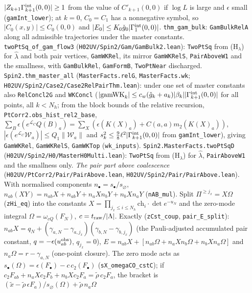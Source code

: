 \documentclass[11pt]{amsart}
\theoremstyle{definition}
\theoremstyle{remark}
\numberwithin{equation}{section}
\begin{document}
$|Z_{k+1}\Gamma^{\rm int}_{k+1}(0,0)|\ge1$ from the value of $C'_{k+1}(0,0)$ if $\log L$ is large and $\epsilon$ small (\texttt{gamInt\_lower});
at $k=0$, $C_0=C_1$ has a nonnegative symbol, so $|C_0(x,y)|\le C_0(0,0)$ and $|E_0|\le K_0\check g_0|\Gamma^{\rm int}_1(0,0)|$.
\texttt{thm\_gam\_bulk}: \texttt{GamBulkRelA} along all admissible trajectories under the master constants. \texttt{twoPtSq\_of\_gam\_flow3}
(\texttt{H02UV/Spin2/Gam/GamBulk2.lean}): \texttt{TwoPtSq} from (H$_\lambda$) for $\hat\lambda$ and both pair vertices, \texttt{GamWKRel}, its mirror \texttt{GamWKRelS},
\texttt{PairAboveW1} and the smallness, with \texttt{GamBulkRel}, \texttt{GamFormB}, \texttt{TwoPtNear} discharged.
\texttt{Spin2.thm\_master\_all} (\texttt{MasterFacts.relG}, \texttt{MasterFacts.wk}; \texttt{H02UV/Spin2/Case2/Case2RelPairThm.lean}): under one set of master constants also
\texttt{RelConcl2G} and \texttt{WKConcl} ($|\mathrm{gamWK}_k|\le c_w(\check g_k+a_k)|\beta_k||\Gamma^{\rm int}_{k+1}(0,0)|$ for all
points, all $k<N_h$; from the block bounds of the relative recursion, \texttt{PtCorr2.obs\_hist\_rel2\_base},
$\sum_B\epsilon(e^{\mathcal L_C}Q(B)_a)=\sum_X(\epsilon(K(X)_a)+C(a,a)m_2(K(X)_a))$, $|\epsilon(e^{\mathcal L_C}\mathcal W_a)|\le Q_1\|\mathcal W_a\|$ and
$s_k^2\le\frac98\ell^2|\Gamma^{\rm int}_{k+1}(0,0)|$ from \texttt{gamInt\_lower}), giving \texttt{GamWKRel}, \texttt{GamWKRelS}, \texttt{GamWKTop}
(\texttt{wk\_inputs}). \texttt{Spin2.MasterFacts.twoPtSqD} (\texttt{H02UV/Spin2/H0/MasterH0Multi.lean}): \texttt{TwoPtSq} from (H$_\lambda$) for
$\hat\lambda$, \texttt{PairAboveW1} and the smallness only.
\emph{The pair part above coalescence} (\texttt{H02UV/PtCorr2/Pair/PairAbove.lean}, \texttt{H02UV/Spin2/Pair/PairAbove.lean}). With normalised components
$n_\bullet=s_\bullet/s_\varnothing$, $n_{ab}(XY)=n_{ab}X+n_{ab}Y+n_aXn_bY+n_bXn_aY$ (\texttt{nAB\_mul}). Split $\Pi^{\ge j_x}=X\Omega$ (\texttt{zHi\_eq}) into the constants
$X=\prod_{j_x\le i\le N_h}\mathrm{ch}_i\cdot\det e^{-u_N}$ and the zero-mode integral $\Omega=\omega_{cQ}(F_N)$, $c=t_{\rm raw}/|\Lambda|$. Exactly
(\texttt{zCst\_coup}, \texttt{pair\_E\_split}): $n_{ab}X=q_N+(\gamma_{a,N}-\gamma_{a,j_x})(\gamma_{b,N}-\gamma_{b,j_x})$ (the Pauli-adjusted accumulated pair
constant, $q=-\epsilon(u^{\rm obs}_{ab})$, $q_{j_x}=0$), $E=n_{ab}X+[n_{ab}\Omega+n_aXn_b\Omega+n_bXn_a\Omega]$ and $n_a\Omega=r-\gamma_{a,N}$ (one-point
closure). The zero mode acts as $s_\bullet(\Omega)=\epsilon(F_\bullet)-c\,c_2(F_\bullet)$ (\texttt{sX\_omegaCO\_cstC}); if
$c_2F_{ab}+n_aXc_2F_b+n_bXc_2F_a=\tilde\rho\,c_2F_a$, the bracket is $(\tilde x-\tilde\rho\,\epsilon F_a)/s_\varnothing(\Omega)+\tilde\rho\,n_a\Omega$
\end{document}
